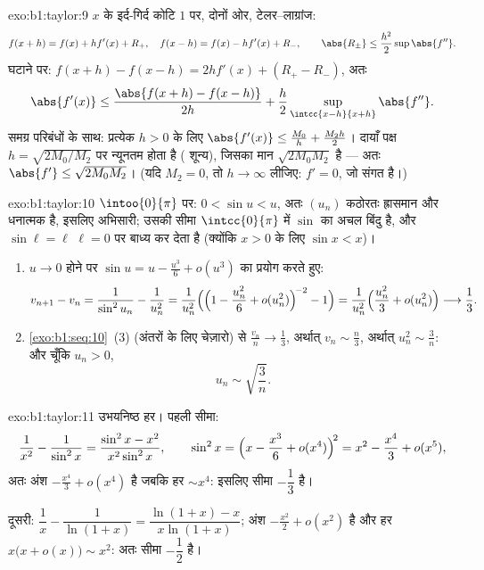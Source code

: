 \begin{solution}{exo:b1:taylor:9}
$x$ के इर्द-गिर्द कोटि $1$ पर, दोनों ओर, टेलर--लाग्रांज:
\[
f(x + h) = f(x) + h f'(x) + R_+,\quad
f(x - h) = f(x) - h f'(x) + R_-,
\qquad \abs{R_\pm} \leq \frac{h^2}{2} \sup \abs{f''} .
\]
घटाने पर: $f(x+h) - f(x-h) = 2h f'(x) + (R_+ - R_-)$, अतः
\[
\abs{f'(x)} \leq \frac{\abs{f(x+h) - f(x-h)}}{2h} +
\frac{h}{2}\sup_{\intcc{x-h}{x+h}}\abs{f''} .
\]
समग्र परिबंधों के साथ: प्रत्येक $h > 0$ के लिए $\abs{f'(x)} \leq
\frac{M_0}{h} + \frac{M_2 h}{2}$। दायाँ पक्ष $h = \sqrt{2M_0/M_2}$ पर
न्यूनतम होता है ( शून्य), जिसका मान $\sqrt{2M_0M_2}$ है --- अतः
$\abs{f'} \leq \sqrt{2M_0M_2}$। (यदि $M_2 = 0$, तो $h \to \infty$ लीजिए: $f'
= 0$, जो संगत है।)
\end{solution}

\begin{solution}{exo:b1:taylor:10}
$\intoo{0}{\pi}$ पर: $0 < \sin u < u$, अतः $(u_n)$ कठोरतः ह्रासमान और
धनात्मक है, इसलिए अभिसारी; उसकी सीमा $\intcc{0}{\pi}$ में $\sin$ का अचल
बिंदु है, और $\sin \ell = \ell$ $\ell = 0$ पर बाध्य कर देता है (क्योंकि $x >
0$ के लिए $\sin x < x$)।
\begin{enumerate}
  \item $u \to 0$ होने पर $\sin u = u - \frac{u^3}{6} + o(u^3)$ का प्रयोग
  करते हुए:
        \[
        v_{n+1} - v_n = \frac{1}{\sin^2 u_n} - \frac{1}{u_n^2}
        = \frac{1}{u_n^2}\Bigl(\Bigl(1 - \frac{u_n^2}{6} +
        o(u_n^2)\Bigr)^{\!-2} - 1\Bigr)
        = \frac{1}{u_n^2}\Bigl(\frac{u_n^2}{3} + o(u_n^2)\Bigr)
        \longrightarrow \frac13 .
        \]
  \item \cref{exo:b1:seq:10}~(3) (अंतरों के लिए चेज़ारो) से $\frac{v_n}{n}
  \to \frac13$, अर्थात् $v_n \sim \frac n3$, अर्थात् $u_n^2 \sim \frac 3n$:
  और चूँकि $u_n > 0$,
        \[
        u_n \sim \sqrt{\frac{3}{n}} .
        \]
\end{enumerate}
\end{solution}

\begin{solution}{exo:b1:taylor:11}
उभयनिष्ठ हर। पहली सीमा:
\[
\frac{1}{x^2} - \frac{1}{\sin^2 x}
= \frac{\sin^2 x - x^2}{x^2\sin^2 x},
\qquad
\sin^2 x = \Bigl(x - \frac{x^3}{6} + o(x^4)\Bigr)^{\!2}
= x^2 - \frac{x^4}{3} + o(x^5) ,
\]
अतः अंश $-\frac{x^4}{3} + o(x^4)$ है जबकि हर $\sim x^4$: इसलिए सीमा
$-\dfrac13$ है।

दूसरी: $\dfrac1x - \dfrac{1}{\ln(1+x)} = \dfrac{\ln(1+x) - x}{x\ln(1+x)}$;
अंश $-\frac{x^2}{2} + o(x^2)$ है और हर $x\bigl(x + o(x)\bigr) \sim x^2$: अतः
सीमा $-\dfrac12$ है।
\end{solution}

